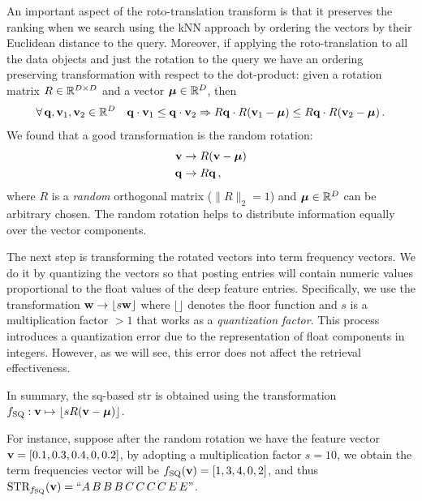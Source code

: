 An important aspect of the roto-translation transform is that it preserves the ranking when we search using the kNN approach by ordering the vectors by their Euclidean distance to the query.
Moreover, if applying the roto-translation to all the data objects and just the rotation to the query we have an ordering preserving transformation with respect to the dot-product: given a rotation matrix $R \in \mathbb{R}^{{D} \times {D}}$ and a vector $\boldsymbol {\mu} \in \mathbb{R}^{{D}}$, then
\begin{equation}
\forall\, \mathbf{q}, \mathbf{v}_1, \mathbf{v}_2 \in \mathbb{R}^{{D}} \quad    \mathbf{q} \cdot \mathbf{v}_1 \leq \mathbf{q} \cdot \mathbf{v}_2 \Rightarrow R\mathbf{q}\cdot R(\mathbf{v}_1 - \boldsymbol {\mu}) \leq R\mathbf{q}\cdot R(\mathbf{v}_2 - \boldsymbol {\mu}) \,.
\end{equation}
We found that a good transformation is the random rotation:
\begin{align}
\mathbf{v} &\to R(\mathbf{v} - \boldsymbol {\mu}) \\
\mathbf{q} &\to R \mathbf{q} \,,
\end{align}
where $R$ is a \emph{random} orthogonal matrix ($\|R\|_2 = 1$) and $\boldsymbol {\mu} \in \mathbb{R}^{{D}}$ can be arbitrary chosen.
The random rotation helps to distribute information equally over the vector components.

The next step is transforming the rotated vectors into term frequency vectors.
We do it by quantizing the vectors so that posting entries will contain numeric values proportional to the float values of the deep feature entries.
Specifically, we use the transformation $\mathbf{w} \to \lfloor s\mathbf{w} \rfloor$ where $\lfloor \rfloor$ denotes the floor function and $s$ is a multiplication factor $> 1$ that works as a \emph{quantization factor}.
This process introduces a quantization error due to the representation of float components in integers.
However, as we will see, this error does not affect the retrieval effectiveness.

In summary, the \gls{sq}-based \gls{str} is obtained using the transformation
$
f_\text{SQ} : \mathbf{v} \mapsto \lfloor s R(\mathbf{v} -\boldsymbol {\mu})\rfloor
$.

For instance, suppose after the random rotation we have the feature vector $\mathbf{v} = [0.1, 0.3, 0.4, 0, 0.2]$, by adopting a multiplication factor $s = 10$, we obtain the term frequencies vector will be $f_\text{SQ}(\mathbf{v}) = [1, 3, 4, 0, 2]$, and thus $\text{STR}_{f_\text{SQ}}(\mathbf{v})=``A\, B\, B\, B \, C \, C\, C\, C\, E\, E"$.

